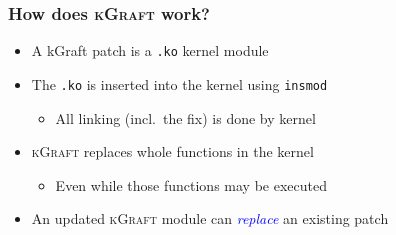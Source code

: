 \documentclass[xcolor=dvipsnames,handout]{beamer}
\let\Oldemph\emph
\renewcommand{\emph}[1]{\textcolor{blue}{\Oldemph{#1}}}
\newcommand\kgr{\textsc{kGraft}\xspace}
\newcommand{\cmd}[2][]{\lstinline[columns=fullflexible, language=bash,
	basicstyle=\ttfamily, #1]$#2$}
\begin{document}
\begin{frame}
  \frametitle{How does \kgr work?}

  \begin{itemize}
    \item A kGraft patch is a \cmd{.ko} kernel module
    \item The \cmd{.ko} is inserted into the kernel using \cmd{insmod}
    \begin{itemize}
      \item All linking (incl.\ the fix) is done by kernel
    \end{itemize}

    \pause

    \item \kgr replaces whole functions in the kernel
    \begin{itemize}
      \item Even while those functions may be executed
    \end{itemize}

    \pause

    \item An updated \kgr module can \emph{replace} an existing patch
  \end{itemize}

\end{frame}
\end{document}

